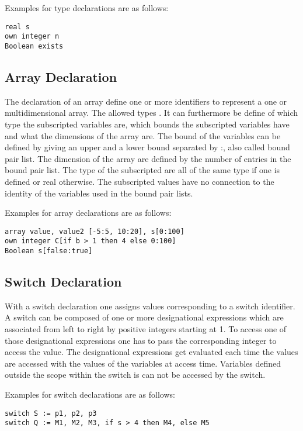\documentclass{article}
\begin{document}
Examples for type declarations are as follows:\\ 
\begin{lstlisting}[language={[60]algol}]
real s
own integer n
Boolean exists
\end{lstlisting}

\subsection{Array Declaration} \label{arrayDecl}
The declaration of an array define one or more identifiers to represent a one or multidimensional array. The allowed types . It can furthermore be define of which type the subscripted variables are, which bounds the subscripted variables have and what the dimensions of the array are. The bound of the variables can be defined by giving an upper and a lower bound separated by :, also called bound pair list. The dimension of the array are defined by the number of entries in the bound pair list. The type of the subscripted are all of the same type if one is defined or real otherwise. The subscripted values have no connection to the identity of the variables used in the bound pair lists.

Examples for array declarations are as follows:\\ 
\begin{lstlisting}[language={[60]algol}]
array value, value2 [-5:5, 10:20], s[0:100]
own integer C[if b > 1 then 4 else 0:100]
Boolean s[false:true]
\end{lstlisting}

\subsection{Switch Declaration} \label{switchDecl}
With a switch declaration one assigns values corresponding to a switch identifier. A switch can be composed of one or more designational expressions which are associated from left to right by positive integers starting at 1. To access one of those designational expressions one has to pass the corresponding integer to access the value. The designational expressions get evaluated each time the values are accessed with the values of the variables at access time. Variables defined outside the scope within the switch is can not be accessed by the switch.

Examples for switch declarations are as follows:\\ 
\begin{lstlisting}[language={[60]algol}]
switch S := p1, p2, p3
switch Q := M1, M2, M3, if s > 4 then M4, else M5
\end{lstlisting}
\end{document}
